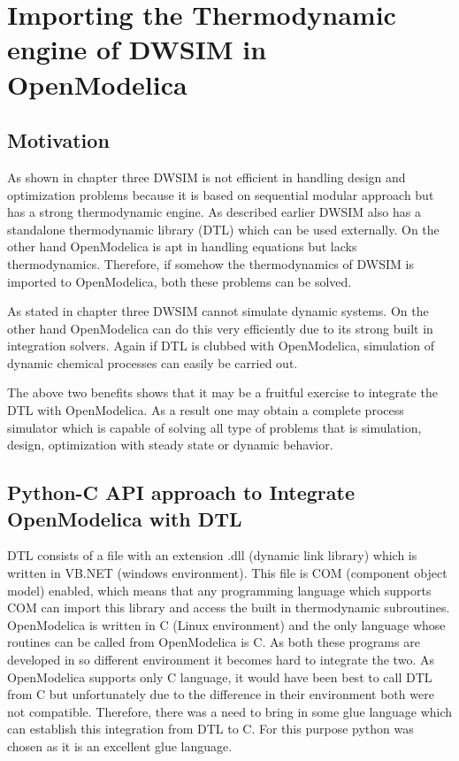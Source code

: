 \documentclass[12pt]{report}
\begin{document}
\chapter{Importing the Thermodynamic engine of DWSIM in OpenModelica}

\section{Motivation}
As shown in chapter three DWSIM is not efficient in handling design and optimization problems because it is based on sequential modular approach but has a strong thermodynamic engine. As described earlier DWSIM also has a standalone thermodynamic library (DTL) which can be used externally. On the other hand OpenModelica is apt in handling equations but lacks thermodynamics. Therefore, if somehow the thermodynamics of DWSIM is imported to OpenModelica, both these problems can be solved.

As stated in chapter three DWSIM cannot simulate dynamic systems. On the other hand OpenModelica can do this very efficiently due to its strong built in integration solvers. Again if DTL is clubbed with OpenModelica, simulation of dynamic chemical processes can easily be carried out.

The above two benefits shows that it may be a fruitful exercise to integrate the DTL with OpenModelica. As a result one may obtain a complete process simulator which is capable of solving all type of problems that is simulation, design, optimization with steady state or dynamic behavior.

\section{Python-C API approach to Integrate OpenModelica with DTL}
DTL consists of a file with an extension .dll (dynamic link library) which is written in VB.NET (windows environment). This file is COM (component object model) enabled, which means that any programming language which supports COM can import this library and access the built in thermodynamic subroutines. OpenModelica is written in C (Linux environment) and the only language whose routines can be called from OpenModelica is C. As both these programs are developed in so different environment it becomes hard to integrate the two.
As OpenModelica supports only C language, it would have been best to call DTL from C but unfortunately due to the difference in their environment both were not compatible. Therefore, there was a need to bring in some glue language which can establish this integration from DTL to C. For this purpose python was chosen as it is an excellent glue language.
\end{document}
